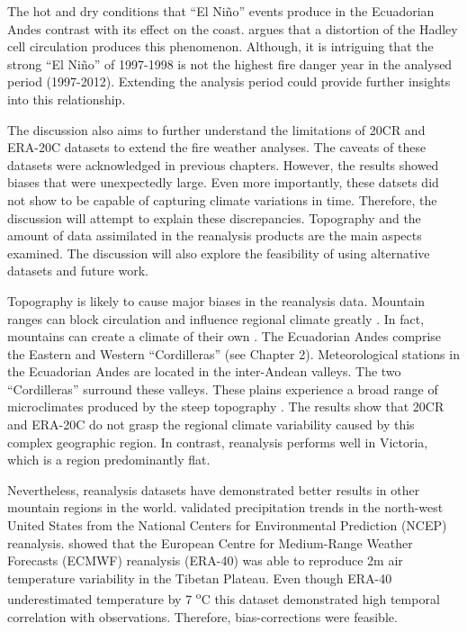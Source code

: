 The hot and dry conditions that \textquotedblleft El Ni\~no\textquotedblright{}
events produce in the Ecuadorian Andes contrast with its effect on
the coast. \citet{Garreaud2009} argues that a distortion of the Hadley
cell circulation produces this phenomenon. Although, it is intriguing
that the strong \textquotedblleft El Ni\~no\textquotedblright{} of 1997-1998
is not the highest fire danger year in the analysed period (1997-2012).
Extending the analysis period could provide further insights into
this relationship. 

The discussion also aims to further understand the limitations of
20CR and ERA-20C datasets to extend the fire weather analyses. The
caveats of these datasets were acknowledged in previous chapters.
However, the results showed biases that were unexpectedly large. Even
more importantly, these datsets did not show to be capable of capturing
climate variations in time. Therefore, the discussion will attempt
to explain these discrepancies. Topography and the amount of data
assimilated in the reanalysis products are the main aspects examined.
The discussion will also explore the feasibility of using alternative
datasets and future work. 

Topography is likely to cause major biases in the reanalysis data.
Mountain ranges can block circulation and influence regional climate
greatly \citep{Beniston2005}. In fact, mountains can create a climate
of their own \citep{Ekhart1948}. The Ecuadorian Andes comprise the
Eastern and Western ``Cordilleras'' (see Chapter 2). Meteorological
stations in the Ecuadorian Andes are located in the inter-Andean valleys.
The two ``Cordilleras'' surround these valleys. These plains experience
a broad range of microclimates produced by the steep topography \citep{Pourrut1995}.
The results show that 20CR and ERA-20C do not grasp the regional climate
variability caused by this complex geographic region. In contrast,
reanalysis performs well in Victoria, which is a region predominantly
flat. 

Nevertheless, reanalysis datasets have demonstrated better results
in other mountain regions in the world. \citet{Widmann1999} validated
precipitation trends in the north-west United States from the National
Centers for Environmental Prediction (NCEP) reanalysis. \citet{Frauenfeld2005}
showed that the European Centre for Medium-Range Weather Forecasts
(ECMWF) reanalysis (ERA-40) was able to reproduce 2m air temperature
variability in the Tibetan Plateau. Even though ERA-40 underestimated
temperature by 7 \textsuperscript{o}C this dataset demonstrated high
temporal correlation with observations. Therefore, bias-corrections
were feasible. 

